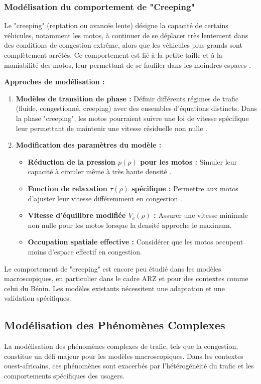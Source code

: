 \subsubsection{Modélisation du comportement de "Creeping"}
Le "creeping" (reptation ou avancée lente) désigne la capacité de certains véhicules, notamment les motos, à continuer de se déplacer très lentement dans des conditions de congestion extrême, alors que les véhicules plus grands sont complètement arrêtés. Ce comportement est lié à la petite taille et à la maniabilité des motos, leur permettant de se faufiler dans les moindres espaces \cite{Saumtally2012, FanWork2015}.

\textbf{Approches de modélisation :}

\begin{enumerate}
    \item \textbf{Modèles de transition de phase :} Définir différents régimes de trafic (fluide, congestionné, creeping) avec des ensembles d'équations distincts. Dans la phase "creeping", les motos pourraient suivre une loi de vitesse spécifique leur permettant de maintenir une vitesse résiduelle non nulle \cite{FanWork2015, Saumtally2012}.
    \item \textbf{Modification des paramètres du modèle :}
    \begin{itemize}
        \item \textbf{Réduction de la pression $p(\rho)$ pour les motos :} Simuler leur capacité à circuler même à très haute densité \cite{ChanutBuisson2003}.
        \item \textbf{Fonction de relaxation $\tau(\rho)$ spécifique :} Permettre aux motos d'ajuster leur vitesse différemment en congestion \cite{FanWork2015}.
        \item \textbf{Vitesse d'équilibre modifiée $V_e(\rho)$ :} Assurer une vitesse minimale non nulle pour les motos lorsque la densité approche le maximum.
        \item \textbf{Occupation spatiale effective :} Considérer que les motos occupent moins d'espace effectif en congestion.
    \end{itemize}
\end{enumerate}

Le comportement de "creeping" est encore peu étudié dans les modèles macroscopiques, en particulier dans le cadre ARZ et pour des contextes comme celui du Bénin. Les modèles existants nécessitent une adaptation et une validation spécifiques.

\subsection{Modélisation des Phénomènes Complexes}
La modélisation des phénomènes complexes de trafic, tels que la congestion, constitue un défi majeur pour les modèles macroscopiques. Dans les contextes ouest-africains, ces phénomènes sont exacerbés par l'hétérogénéité du trafic et les comportements spécifiques des usagers.

